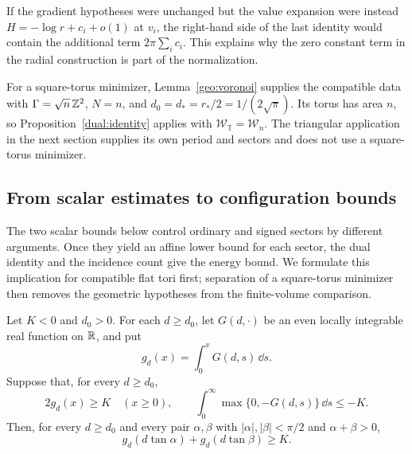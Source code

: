 If the gradient hypotheses were unchanged but the value expansion were
instead \(H=-\log r+c_i+o(1)\) at \(v_i\), the right-hand side of the
last identity would contain the additional term
\(2\pi\sum_i c_i\).  This explains why the zero constant term
in the radial construction is part of the normalization.

For a square-torus minimizer, Lemma~\ref{geo:voronoi} supplies the
compatible data with \(\Gamma=\sqrt n\,\mathbb Z^2\), \(N=n\), and
\(d_0=d_*=r_*/2=1/(2\sqrt\pi)\). Its torus has area \(n\), so
Proposition~\ref{dual:identity} applies with
\(\mathcal W_{\mathbb T}=\mathcal W_n\). The triangular application
in the next section supplies its own period and sectors and does not
use a square-torus minimizer.

\subsection{From scalar estimates to configuration bounds}

The two scalar bounds below control ordinary and signed sectors by
different arguments. Once they yield an affine lower bound for each
sector, the dual identity and the incidence count give the energy
bound. We formulate this implication for compatible flat tori first;
separation of a square-torus minimizer then removes the geometric
hypotheses from the finite-volume comparison.

\begin{lemma}
\label{dual:signed-endpoints}
Let \(K<0\) and \(d_0>0\). For each \(d\geq d_0\), let
\(G(d,\cdot)\) be an even locally integrable real function on \(\mathbb R\),
and put
\[
 g_d(x)=\int_0^xG(d,s)\,\dd s.
\]
Suppose that, for every \(d\geq d_0\),
\begin{equation}
 2g_d(x)\geq K\quad(x\geq0),\qquad
 \int_0^\infty\max\{0,-G(d,s)\}\,\dd s\leq-K.
 \label{dual:scalar-input}
\end{equation}
Then, for every \(d\geq d_0\) and every pair \(\alpha,\beta\) with
\(|\alpha|,|\beta|<\pi/2\) and \(\alpha+\beta>0\),
\begin{equation}
 g_d(d\tan\alpha)+g_d(d\tan\beta)\geq K.
 \label{dual:signed-bound}
\end{equation}
\end{lemma}

